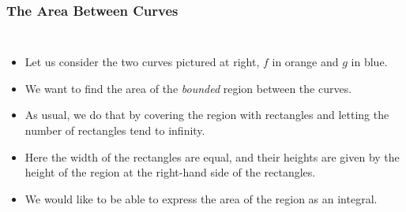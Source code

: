 \documentclass[serif,ignorenonframetext]{beamer}
\begin{document}
\begin{frame}
  \frametitle{The Area Between Curves}
  \begin{columns}
  \begin{itemize}
  \item<1-> Let us consider the two curves pictured at right, $f$ in
    orange and $g$ in blue.
  \item<2-> We want to find the area of the \textit{bounded} region between
    the curves.
  \item<3-> As usual, we do that by covering the region with rectangles
    and letting the number of rectangles tend to infinity.
  \item<4-> Here the width of the rectangles are equal, and their heights
    are given by the height of the region at the right-hand side of the
    rectangles.
  \item<10-> We would like to be able to express the area of the region
    as an integral.
  \end{itemize}

\end{columns}
\end{frame}
\end{document}
